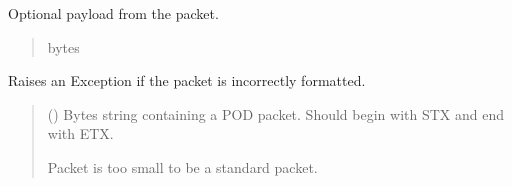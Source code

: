\documentclass[letterpaper,10pt,english]{sphinxmanual}
\begin{document}
\begin{fulllineitems}
\begin{fulllineitems}
\begin{quote}
\begin{description}
\end{description}\end{quote}

\end{fulllineitems}


\begin{fulllineitems}
\label{\detokenize{Morelia.Packets:Morelia.Packets.Standard.PacketStandard.payload}}
\pysigstartsignatures
{}
\pysigstopsignatures
\sphinxAtStartPar
Optional payload from the packet.
\begin{quote}\begin{description}
\sphinxAtStartPar
bytes

\end{description}\end{quote}

\end{fulllineitems}


\begin{fulllineitems}
\label{\detokenize{Morelia.Packets:Morelia.Packets.Standard.PacketStandard.CheckIfPacketIsValid}}
\pysigstartsignatures
{}
\pysigstopsignatures
\sphinxAtStartPar
Raises an Exception if the packet is incorrectly formatted.
\begin{quote}\begin{description}
\sphinxAtStartPar
{} () \textendash{} Bytes string containing a POD packet. Should begin with STX and                 end with ETX.

\sphinxAtStartPar
{} \textendash{} Packet is too small to be a standard packet.

\end{description}\end{quote}


\end{fulllineitems}
\end{fulllineitems}
\end{document}
